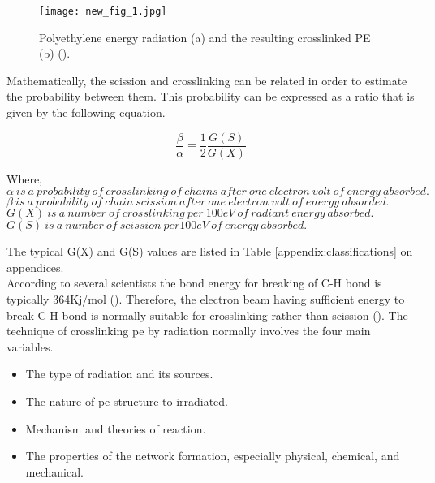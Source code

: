 \begin{figure}[H]
\captionsetup[subfigure]{justification=raggedright}

\centering
\texttt{[image: new\_fig\_1.jpg]}
\caption{Polyethylene energy radiation (a) and the resulting crosslinked PE (b) (\cite{peacock2000handbook}).}
\label{ch3:figure:radiation}
\end{figure}

Mathematically, the scission and crosslinking can be related in order to estimate the probability between them. This probability can be expressed as a ratio that is given by the following equation.

\begin{equation}
    \frac{\beta}{\alpha}=\frac{1}{2}\frac{G(S)}{G(X)}
\end{equation}

\begin{doublespace}
\noindent Where, \\
$\alpha\ is\ a\ probability\ of\ crosslinking\ of\ chains\ after\ one\ electron\ volt\ of\ energy\ absorbed.$ \\
$\beta\ is\ a\ probability\ of\ chain\ scission\ after\ one\ electron\ volt\ of\ energy\ absorded.$ \\
$G(X)\ is\ a\ number\ of\ crosslinking\ per\ 100eV\ of\ radiant\ energy\ absorbed.$ \\
$G(S)\ is\ a\ number\ of\ scission\ per 100eV\ of\ energy\ absorbed.$ \\
\end{doublespace}

The typical G(X) and G(S) values are listed in Table \ref{appendix:classifications} on appendices. \\

According to several scientists the bond energy for breaking of C-H bond is typically 364Kj/mol (\cite{peacock2000handbook}). Therefore, the electron beam having sufficient energy to break C-H bond is normally suitable for crosslinking rather than scission (\cite{peacock2000handbook}). The technique of crosslinking \acrshort{pe} by radiation normally involves the four main variables. 

\begin{itemize}
    \item The type of radiation and its sources.
    \item The nature of \acrshort{pe} structure to irradiated.
    \item Mechanism and theories of reaction.
    \item The properties of the network formation, especially physical, chemical, and mechanical. 
\end{itemize}

